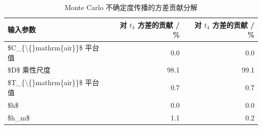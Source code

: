 \begin{table}[H]
\centering
\caption{Monte Carlo 不确定度传播的方差贡献分解}
\label{tab:mc}
\footnotesize
\begin{tabular}{@{}lrr@{}}
\toprule
输入参数 & 对 $t_3$ 方差的贡献 / \% & 对 $t_4$ 方差的贡献 / \% \\
\midrule
\$C\_\{\textbackslash\{\}mathrm\{air\}\}\$ 平台值 & 0.0 & 0.0 \\
\$D\$ 乘性尺度 & 98.1 & 99.1 \\
\$T\_\{\textbackslash\{\}mathrm\{air\}\}\$ 平台值 & 0.7 & 0.7 \\
\$h\$ & 0.0 & 0.0 \\
\$h\_m\$ & 1.1 & 0.2 \\
\bottomrule
\end{tabular}
\end{table}
